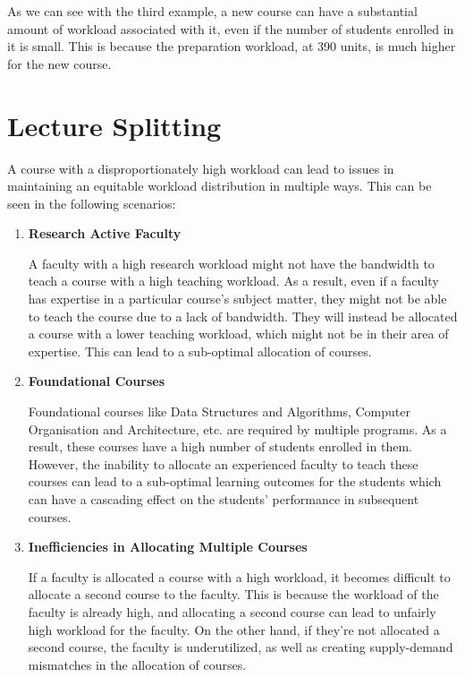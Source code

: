 As we can see with the third example, a new course can have a substantial amount of workload associated with it, even if the number of students enrolled in it is small. This is because the preparation workload, at 390 units, is much higher for the new course.

\section{Lecture Splitting}

A course with a disproportionately high workload can lead to issues in maintaining an equitable workload distribution in multiple ways. This can be seen in the following scenarios:

\begin{enumerate}

  \item \textbf{Research Active Faculty}

        A faculty with a high research workload might not have the bandwidth to teach a course with a high teaching workload. As a result, even if a faculty has expertise in a particular course's subject matter, they might not be able to teach the course due to a lack of bandwidth. They will instead be allocated a course with a lower teaching workload, which might not be in their area of expertise. This can lead to a sub-optimal allocation of courses.

  \item \textbf{Foundational Courses}

        Foundational courses like Data Structures and Algorithms, Computer Organisation and Architecture, etc. are required by multiple programs. As a result, these courses have a high number of students enrolled in them. However, the inability to allocate an experienced faculty to teach these courses can lead to a sub-optimal learning outcomes for the students which can have a cascading effect on the students' performance in subsequent courses.

  \item \textbf{Inefficiencies in Allocating Multiple Courses}

        If a faculty is allocated a course with a high workload, it becomes difficult to allocate a second course to the faculty. This is because the workload of the faculty is already high, and allocating a second course can lead to unfairly high workload for the faculty. On the other hand, if they're not allocated a second course, the faculty is underutilized, as well as creating supply-demand mismatches in the allocation of courses.

\end{enumerate}

